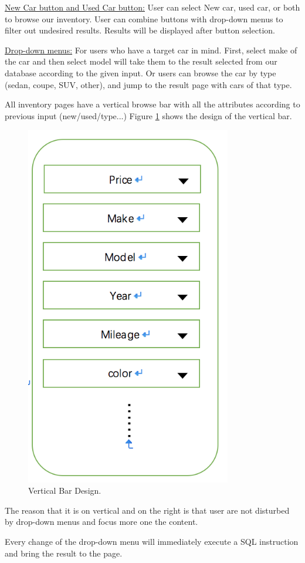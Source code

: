 \documentclass[12pt]{article}
\begin{document}
\underline{New Car button and Used Car button:} User can select New car, used car, or both to browse our inventory. User can combine buttons with drop-down menus to filter out undesired results. Results will be displayed after button selection.\par
\underline{Drop-down menus:} For users who have a target car in mind. First, select make of the car and then select model will take them to the result selected from our database according to the given input. Or users can browse the car by type (sedan, coupe, SUV, other), and jump to the result page with cars of that type.\par
All inventory pages have a vertical browse bar with all the attributes according to previous input (new/used/type...) Figure \ref{verBar} shows the design of the vertical bar.
\begin{figure}[!h]
\caption{Vertical Bar Design.} \label{verBar}
\begin{center}
\includegraphics[width=9cm]{vertical_bar}
\end{center}
\end{figure}
\par The reason that it is on vertical and on the right is that user are not disturbed by drop-down menus and focus more one the content.\par
Every change of the drop-down menu will immediately execute a SQL instruction and bring the result to the page.
\end{document}

